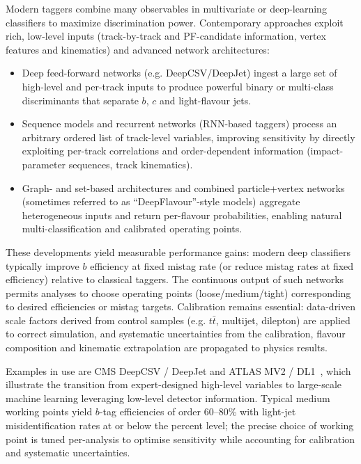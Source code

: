 Modern taggers combine many observables in multivariate or deep-learning classifiers to maximize discrimination power. Contemporary approaches exploit rich, low-level inputs (track-by-track and PF-candidate information, vertex features and kinematics) and advanced network architectures:

\begin{itemize}
  \item Deep feed-forward networks (e.g. DeepCSV/DeepJet) ingest a large set of high-level and per-track inputs to produce powerful binary or multi-class discriminants that separate $b$, $c$ and light-flavour jets.
  \item Sequence models and recurrent networks (RNN-based taggers) process an arbitrary ordered list of track-level variables, improving sensitivity by directly exploiting per-track correlations and order-dependent information (impact-parameter sequences, track kinematics).
  \item Graph- and set-based architectures and combined particle+vertex networks (sometimes referred to as ``DeepFlavour''-style models) aggregate heterogeneous inputs and return per-flavour probabilities, enabling natural multi-classification and calibrated operating points.
\end{itemize}

These developments yield measurable performance gains: modern deep classifiers typically improve $b$ efficiency at fixed mistag rate (or reduce mistag rates at fixed efficiency) relative to classical taggers. The continuous output of such networks permits analyses to choose operating points (loose/medium/tight) corresponding to desired efficiencies or mistag targets. Calibration remains essential: data-driven scale factors derived from control samples (e.g. $t\bar t$, multijet, dilepton) are applied to correct simulation, and systematic uncertainties from the calibration, flavour composition and kinematic extrapolation are propagated to physics results.

Examples in use are CMS DeepCSV / DeepJet and ATLAS MV2 / DL1~\parencite{CMS:2017wtu,ATLAS:2019bwq}, which illustrate the transition from expert-designed high-level variables to large-scale machine learning leveraging low-level detector information. Typical medium working points yield $b$-tag efficiencies of order 60–80\% with light-jet misidentification rates at or below the percent level; the precise choice of working point is tuned per-analysis to optimise sensitivity while accounting for calibration and systematic uncertainties.

